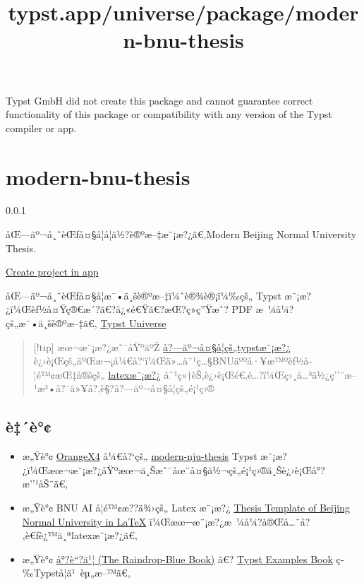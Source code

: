 Typst GmbH did not create this package and cannot guarantee correct
functionality of this package or compatibility with any version of the
Typst compiler or app.


\title{typst.app/universe/package/modern-bnu-thesis}

\label{banner}
\label{template-thumbnail}

\section{modern-bnu-thesis}\label{modern-bnu-thesis}

{ 0.0.1 }

åŒ---äº¬å¸ˆèŒƒå¤§å­¦å­¦ä½?è®ºæ--‡æ¨¡æ?¿ã€‚Modern Beijing Normal University
Thesis.

\href{/app?template=modern-bnu-thesis&version=0.0.1}{Create project in
app}

\label{readme}
åŒ---äº¬å¸ˆèŒƒå¤§å­¦æ¯•ä¸šè®ºæ--‡ï¼ˆè®¾è®¡ï¼‰çš„ Typst
æ¨¡æ?¿ï¼Œèƒ½å¤Ÿç®€æ´?ã€?å¿«é€Ÿã€?æŒ?ç»­ç''Ÿæˆ? PDF
æ~¼å¼?çš„æ¯•ä¸šè®ºæ--‡ã€‚
\href{https://typst.app/universe/package/modern-bnu-thesis}{Typst
Universe}

\begin{quote}
{[}!tip{]} æœ¬æ¨¡æ?¿æ˜¯åŸºäºŽ
\href{https://github.com/nju-lug/modern-nju-thesis/tree/main}{å?---äº¬å¤§å­¦çš„typstæ¨¡æ?¿}
è¿›è¡Œçš„äºŒæ¬¡å¼€å?{}`ï¼Œä»\ldots å¯¹ç\ldots§BNUäººå·¥æ™ºèƒ½å­¦é™¢æŒ‡å®šçš„
\href{https://www.overleaf.com/latex/templates/thesis-template-of-beijing-normal-university-in-latex/nrjdjsvfxhms}{latexæ¨¡æ?¿}
å¯¹ç»†èŠ‚è¿›è¡Œé€‚é\ldots?ï¼Œç›¸å\ldots³ä½¿ç''¨æ--¹æ³•å?¯ä»¥å?‚è§?å?---äº¬å¤§å­¦çš„é¡¹ç›®
\end{quote}

\subsection{è‡´è°¢}\label{uxe8uxe8}

\begin{itemize}
\tightlist
\item
  æ„Ÿè°¢ \href{https://github.com/OrangeX4}{OrangeX4} å¼€å?{}`çš„
  \href{https://github.com/nju-lug/modern-nju-thesis}{modern-nju-thesis}
  Typst
  æ¨¡æ?¿ï¼Œæœ¬æ¨¡æ?¿åŸºæœ¬ä¸Šæ˜¯åœ¨å¤§ä½¬çš„é¡¹ç›®ä¸Šè¿›è¡Œå°?æ''¹åŠ¨ã€‚
\item
  æ„Ÿè°¢ BNU AI å­¦é™¢æ??ä¾›çš„ Latex æ¨¡æ?¿
  \href{https://www.overleaf.com/latex/templates/thesis-template-of-beijing-normal-university-in-latex/nrjdjsvfxhms}{Thesis
  Template of Beijing Normal University in LaTeX}
  ï¼Œæœ¬æ¨¡æ?¿æ~¼å¼?å®Œå\ldots¨å?‚è€ƒè¿™ä¸ªlatexæ¨¡æ?¿ã€‚
\item
  æ„Ÿè°¢ \href{https://typst-doc-cn.github.io/tutorial/}{å°?è``?ä¹¦ (The
  Raindrop-Blue Book)} ã€?
  \href{https://sitandr.github.io/typst-examples-book/book/}{Typst
  Examples Book} ç­‰Typstå­¦ä¹~èµ„æ--™ã€‚
\end{itemize}

